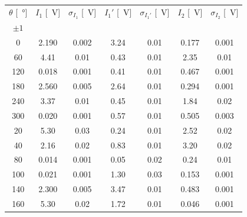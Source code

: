 \documentclass[10pt,oneside,a4paper]{article}
\begin{document}
\begin{center}
\label{tab:ultima}
\begin{tabular}{c|c|c|c|c|c|c}
\toprule
$\theta$ [\SI{}{\degree}] & $I_1$ [\SI{}{V}] & $\sigma_{I_1}$ [\SI{}{V}] & $I_1'$ [\SI{}{V}] & $\sigma_{I_1'}$ [\SI{}{V}] & $I_2$ [\SI{}{V}] & $\sigma_{I_2}$ [\SI{}{V}]   \\
$\pm 1$ & & & & & & \\
\midrule
  0  & 2.190 & 0.002 & 3.24 & 0.01 & 0.177 & 0.001 		\\		
  60 & 4.41 & 0.01 & 0.43 & 0.01 & 2.35 & 0.01 			\\		
 120 & 0.018 & 0.001 & 0.41 & 0.01 & 0.467 	& 0.001 	\\		
 180 & 2.560 & 0.005 & 2.64 & 0.01 	& 0.294 & 0.001 	\\		
 240 & 3.37 & 0.01 & 0.45 & 0.01 & 1.84 & 0.02 			\\		
 300 & 0.020 & 0.001 & 0.57 & 0.01 & 0.505 & 0.003 		\\		
  20 & 5.30 & 0.03 & 0.24 & 0.01 & 2.52 & 0.02 			\\		
  40 & 2.16 & 0.02 & 0.83 & 0.01 & 3.20 & 0.02 			\\		
  80 & 0.014 & 0.001 & 0.05 & 0.02 & 0.24 & 0.01 		\\		
 100 & 0.021 & 0.001 & 1.30 & 0.03 & 0.153 & 0.001 		\\		
 140 & 2.300 & 0.005 & 3.47 & 0.01 & 0.483 & 0.001 		\\		
 160 & 5.30 & 0.02 & 1.72 & 0.01 & 0.046 & 0.001 		\\		
 \bottomrule
\end{tabular}


\end{center}
\end{document}
